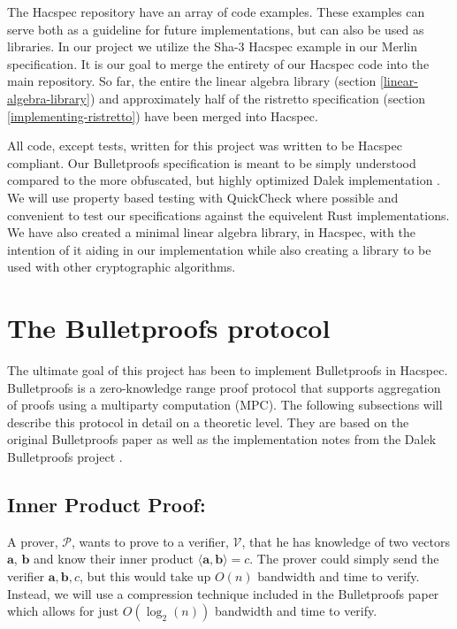 \documentclass{article}
\renewcommand{\vec}[1]{\boldsymbol{#1}}
\newcommand{\V}{\mathcal{V}}
\renewcommand{\P}{\mathcal{P}}
\newcommand{\dotp}[2]{\langle #1, #2 \rangle}
\begin{document}
The Hacspec repository have an array of code examples. These examples
can serve both as a guideline for future implementations, but can also
be used as libraries. In our project we utilize the Sha-3 Hacspec
example in our Merlin specification. It is our goal to merge the
entirety of our Hacspec code into the main repository. So far, the
entire the linear algebra library (section \ref{linear-algebra-library})
and approximately half of the ristretto specification (section
\ref{implementing-ristretto}) have been merged into Hacspec.

All code, except tests, written for this project was written to be
Hacspec compliant. Our Bulletproofs specification is meant to be simply
understood compared to the more obfuscated, but highly optimized Dalek
implementation \cite{dalek}. We will use property based testing with
QuickCheck \cite{quickcheck} where possible and convenient to test
our specifications against the equivelent Rust implementations. We
have also created a minimal linear algebra library, in Hacspec, with
the intention of it aiding in our implementation while also creating
a library to be used with other cryptographic algorithms.

\section{The Bulletproofs protocol} \label{bulletproofs}

The ultimate goal of this project has been to implement Bulletproofs
in Hacspec. Bulletproofs is a zero-knowledge range proof protocol
that supports aggregation of proofs using a multiparty computation
(MPC). The following subsections will describe this protocol in detail
on a theoretic level. They are based on the original Bulletproofs
paper \cite{bulletproofs} as well as the implementation notes from
the Dalek Bulletproofs project \cite{dalek}.

\subsection{Inner Product Proof:} \label{inner-product-proof}
A prover, $\P$, wants to prove to a verifier, $\V$, that he has
knowledge of two vectors $\vec{a}$, $\vec{b}$ and know their inner
product $\dotp{\vec{a}}{\vec{b}} = c$. The prover could simply send
the verifier $\vec{a}, \vec{b}, c$, but this would take up $O(n)$
bandwidth and time to verify. Instead, we will use a compression
technique included in the Bulletproofs paper which allows for just
$O(\log_2(n))$ bandwidth and time to verify.
\end{document}

